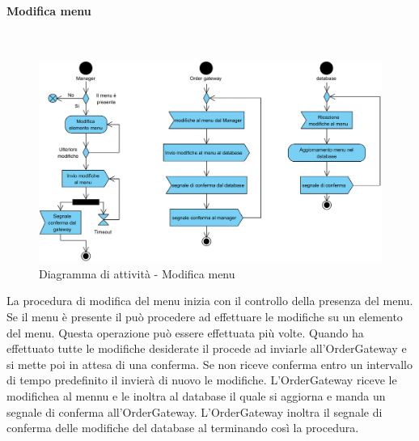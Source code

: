 \paragraph{Modifica menu}\mbox{}\\
\nopagebreak
\begin{figure}[H]
	\centering
	\includegraphics[width=14cm]{diagrammi_img/attivita/manager_menu_modifiche.png}
	\caption{Diagramma di attività - Modifica menu}
\end{figure}
La procedura di modifica del menu inizia con il controllo della presenza del menu. Se il menu è presente il \Manager{} può procedere ad effettuare le modifiche su un elemento del menu. Questa operazione può essere effettuata più volte. Quando ha effettuato tutte le modifiche desiderate il \Manager{} procede ad inviarle all'OrderGateway e si mette poi in attesa di una conferma. Se non riceve conferma entro un intervallo di tempo predefinito il \Manager{} invierà di nuovo le modifiche. L'OrderGateway riceve le modifichea al mennu e le inoltra al database il quale si aggiorna e manda un segnale di conferma all'OrderGateway. L'OrderGateway inoltra il segnale di conferma delle modifiche del database al \Manager{} terminando così la procedura.

